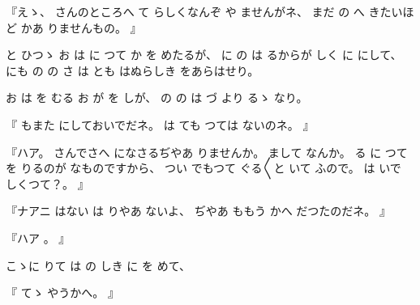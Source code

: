 %
『えゝ、
%
さんのところへ
て
らしくなんぞ
や
ませんがネ、
%
まだ
の
へ
きたいほど
かあ
りませんもの。
』

%
と
ひつゝ
お
は
に
つて
か
を
めたるが、
%
に
の
は
るからが
しく
に
にして、%
%
にも
の
の
さ
は
とも
はぬらしき
をあらはせり。

%
お
は
を
むる
お
が
を
しが、
%
の
の
は
づ
より
るゝ
なり。

%
『
もまた
にしておいでだネ。
%
は
ても
つては
ないのネ。
』

%
『ハア。
%
さんでさへ
になさるぢやあ
りませんか。
%
まして
なんか。
%
る
に
つて
を
りるのが
なものですから、
%
つい
でもつて
ぐる〳〵と
いて
ふので。
%
は
いで
しくつて？。
』

%
『ナアニ
はない
は
りやあ
ないよ、
%
ぢやあ
ももう
かへ
だつたのだネ。
』

%
『ハア
。
』

%
こゝに
りて
は
の
しき
に
を
めて、

%
『
てゝ
やうかへ。
』

